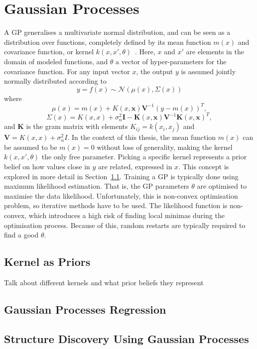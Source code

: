 \section{Gaussian Processes}
A GP generalises a multivariate normal distribution, and can be seen
as a distribution over functions, completely defined by its
mean function $m(x)$ and covariance function, or kernel $k(x, x',
\theta)$~\cite{Rasmussen-Williams-2006}. Here, $x$ and $x'$ are
elements in the domain of modeled functions, and $\theta$ a
vector of hyper-parameters for the covariance function. For any input
vector $x$, the output $y$ is assumed jointly normally distributed according to
\begin{equation}
  \label{eq:gp}
  y = f(x) \sim \mathcal{N}(\mu(x), \Sigma(x))
\end{equation}
where
\begin{equation}
  \label{eq:gp-mean-function}
  \mu(x) = m(x) + K(x, \textbf{x})\textbf{V}^{-1}{(y-m(x))}^{T},
\end{equation}
\begin{equation}
  \label{eq:gp-covariance-function}
  \Sigma(x) = K(x, x) + \sigma^{2}_n\textbf{I} - \textbf{K}(x, \textbf{x})\textbf{V}^{-1}{\textbf{K}(x, \textbf{x})}^{T},
\end{equation}
and $\textbf{K}$ is the gram matrix with elements $K_{ij} = k(x_i, x_j)$ and $\textbf{V}
= K(x, x) + \sigma_n^2I$.
In the context of this thesis, the mean function $m(x)$ can be assumed to be $m(x) = 0$
without loss of generality, making the kernel $k(x, x', \theta)$
the only free parameter. Picking a specific kernel represents a prior
belief on how values close in $y$ are related, expressed in $x$. This
concept is explored in more detail in Section~\ref{sec:kernels-as-priors}.
Training a GP is typically done using maximum likelihood
estimation. That is, the GP parameters $\theta$ are optimised to
maximise the data likelihood. Unfortunately, this is non-convex
optimisation problem, so
iterative methods have to be used. The likelihood function is
non-convex, which introduces a high risk of finding local minimas
during the optimisation process. Because of this, random restarts are
typically required to find a good $\theta$.

\subsection{Kernel as Priors}\label{sec:kernels-as-priors}

Talk about different kernels and what prior beliefs they represent

\subsection{Gaussian Processes Regression}

\subsection{Structure Discovery Using Gaussian Processes}
